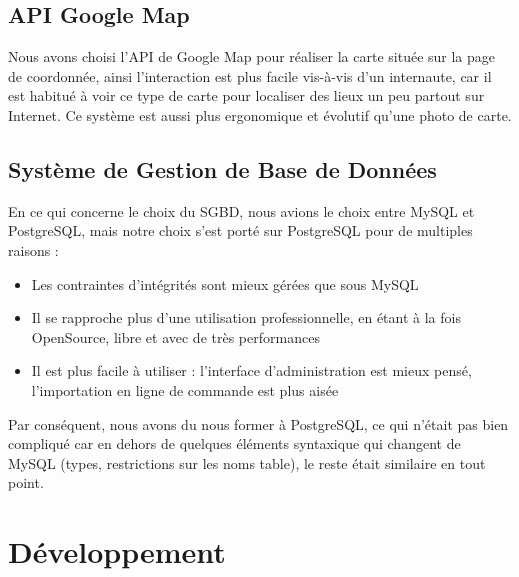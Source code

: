 \documentclass[11pt]{report}
\begin{document}
\subsection{API Google Map}
Nous avons choisi l'API de Google Map pour réaliser la carte située sur la page
de coordonnée, ainsi l'interaction est plus facile vis-à-vis d'un internaute,
car il est habitué à voir ce type de carte pour localiser des lieux un peu
partout sur Internet. Ce système est aussi plus ergonomique et évolutif qu'une
photo de carte.

\subsection{Système de Gestion de Base de Données}
En ce qui concerne le choix du SGBD, nous avions le choix entre MySQL et
PostgreSQL, mais notre choix s'est porté sur PostgreSQL pour de multiples
raisons : \\
\begin{itemize}
  \item Les contraintes d'intégrités sont mieux gérées que sous MySQL
  \item Il se rapproche plus d'une utilisation professionnelle, en étant à la
  fois OpenSource, libre et avec de très performances
  \item Il est plus facile à utiliser : l'interface d'administration est mieux
  pensé, l'importation en ligne de commande est plus aisée \\
\end{itemize}

\par Par conséquent, nous avons du nous former à PostgreSQL, ce qui n'était pas
bien compliqué car en dehors de quelques éléments syntaxique qui changent de
MySQL (types, restrictions sur les noms table), le reste était similaire en tout
point.

\section{Développement}
\end{document}
